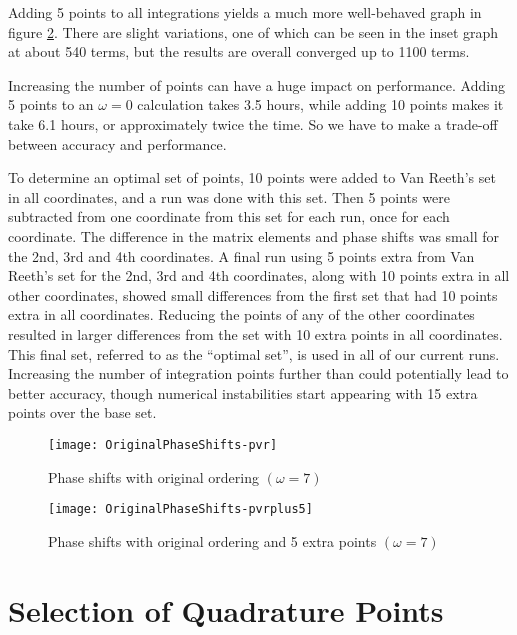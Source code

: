 \documentclass[Dissertation.tex]{subfiles}
\begin{document}
Adding 5 points to all integrations yields a much more well-behaved graph in figure \ref{fig:OriginalPhaseShifts-pvrplus5}. There are slight variations, one of which can be seen in the inset graph at about 540 terms, but the results are overall converged up to 1100 terms.

Increasing the number of points can have a huge impact on performance. Adding 5 points to an $\omega = 0$ calculation takes 3.5 hours, while adding 10 points makes it take 6.1 hours, or approximately twice the time. So we have to make a trade-off between accuracy and performance.

To determine an optimal set of points, 10 points were added to Van Reeth's set in all coordinates, and a run was done with this set. Then 5 points were subtracted from one coordinate from this set for each run, once for each coordinate. The difference in the matrix elements and phase shifts was small for the 2nd, 3rd and 4th coordinates. A final run using 5 points extra from Van Reeth's set for the 2nd, 3rd and 4th coordinates, along with 10 points extra in all other coordinates, showed small differences from the first set that had 10 points extra in all coordinates. Reducing the points of any of the other coordinates resulted in larger differences from the set with 10 extra points in all coordinates. This final set, referred to as the ``optimal set'', is used in all of our current runs. Increasing the number of integration points further than could potentially lead to better accuracy, though numerical instabilities start appearing with 15 extra points over the base set.


\begin{figure}[H]
	\centering
	\texttt{[image: OriginalPhaseShifts-pvr]}
	\caption{Phase shifts with original ordering $(\omega = 7)$}
	\label{fig:OriginalPhaseShifts-pvr}
\end{figure}

\begin{figure}[H]
	\centering
	\texttt{[image: OriginalPhaseShifts-pvrplus5]}
	\caption{Phase shifts with original ordering and 5 extra points $(\omega = 7)$}
	\label{fig:OriginalPhaseShifts-pvrplus5}
\end{figure}



\section{Selection of Quadrature Points}
\label{sec:SelQuadPoints2}
\end{document}
